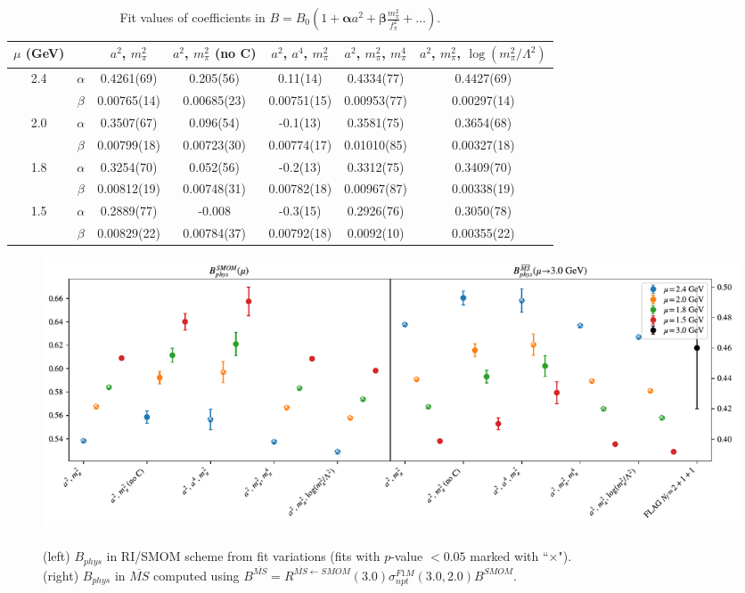 \documentclass[12pt]{extarticle}
\begin{document}
\begin{table}[h!]
\begin{center}
\begin{tabular}{|c c|c|c|c|c|c|}
\hline
$\mu$ (GeV) &  & $a^2$, $m_\pi^2$& $a^2$, $m_\pi^2$ (no C)& $a^2$, $a^4$, $m_\pi^2$& $a^2$, $m_\pi^2$, $m_\pi^4$& $a^2$, $m_\pi^2$, $\log(m_\pi^2/\Lambda^2)$\\
\hline
\multirow{2}{0.5in}{2.4} & $\alpha$ & 0.4261(69)& 0.205(56)& 0.11(14)& 0.4334(77)& 0.4427(69)\\
 & $\beta$ & 0.00765(14)& 0.00685(23)& 0.00751(15)& 0.00953(77)& 0.00297(14)\\
\hline
\multirow{2}{0.5in}{2.0} & $\alpha$ & 0.3507(67)& 0.096(54)& -0.1(13)& 0.3581(75)& 0.3654(68)\\
 & $\beta$ & 0.00799(18)& 0.00723(30)& 0.00774(17)& 0.01010(85)& 0.00327(18)\\
\hline
\multirow{2}{0.5in}{1.8} & $\alpha$ & 0.3254(70)& 0.052(56)& -0.2(13)& 0.3312(75)& 0.3409(70)\\
 & $\beta$ & 0.00812(19)& 0.00748(31)& 0.00782(18)& 0.00967(87)& 0.00338(19)\\
\hline
\multirow{2}{0.5in}{1.5} & $\alpha$ & 0.2889(77)& -0.008& -0.3(15)& 0.2926(76)& 0.3050(78)\\
 & $\beta$ & 0.00829(22)& 0.00784(37)& 0.00792(18)& 0.0092(10)& 0.00355(22)\\
\hline
\end{tabular}
\caption{Fit values of coefficients in $B = B_0(1 + \mathbf{\alpha} a^2 + \mathbf{\beta} \frac{m_\pi^2}{f_\pi^2} + \ldots)$.}
\end{center}
\end{table}
\begin{figure}
\centering
\includegraphics[page=1, width=1.1\textwidth]{plots/VVmAA_fit_summary.pdf}
\caption{\\(left) $B_{phys}$ in RI/SMOM scheme from fit variations (fits with $p$-value $<0.05$ marked with ``$\times$"). \\(right) $B_{phys}$ in $\overline{MS}$ computed using $B^{\overline{MS}} = R^{\overline{MS}\leftarrow SMOM}(3.0)\sigma_{npt}^{F1M}(3.0, 2.0) B^{SMOM}$.}
\end{figure}
\end{document}
